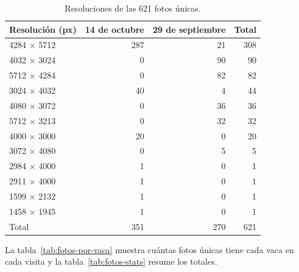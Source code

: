 \begin{table}[H]
  \centering
  \caption{Resoluciones de las 621 fotos únicas.}
  \label{tab:resoluciones}
  \begin{tabular}{lrrr}
    \toprule
    Resolución (px) & 14 de octubre & 29 de septiembre & Total \\
    \midrule
    4284 $\times$ 5712 & 287 & 21 & 308 \\
    4032 $\times$ 3024 & 0 & 90 & 90 \\
    5712 $\times$ 4284 & 0 & 82 & 82 \\
    3024 $\times$ 4032 & 40 & 4 & 44 \\
    4080 $\times$ 3072 & 0 & 36 & 36 \\
    5712 $\times$ 3213 & 0 & 32 & 32 \\
    4000 $\times$ 3000 & 20 & 0 & 20 \\
    3072 $\times$ 4080 & 0 & 5 & 5 \\
    2984 $\times$ 4000 & 1 & 0 & 1 \\
    2911 $\times$ 4000 & 1 & 0 & 1 \\
    1599 $\times$ 2132 & 1 & 0 & 1 \\
    1458 $\times$ 1945 & 1 & 0 & 1 \\
    \midrule
    Total & 351 & 270 & 621 \\
    \bottomrule
  \end{tabular}
\end{table}

La tabla~\ref{tab:fotos-por-vaca} muestra cuántas fotos únicas tiene cada vaca en cada visita y la tabla~\ref{tab:fotos-stats} resume los totales.


